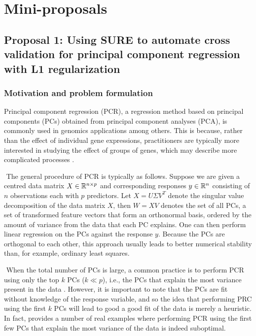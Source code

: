 

\section{Mini-proposals}

\subsection{Proposal 1: Using SURE to automate cross validation for principal component regression with L1 regularization} %
\subsubsection{Motivation and problem formulation}
Principal component regression (PCR), a regression method based on principal components (PCs) obtained from principal component analyses (PCA), is commonly used in genomics applications among others. This is because, rather than the effect of individual gene expressions, practitioners are typically more interested in studying the effect of groups of genes, which may describe more complicated processes \citep{ding2022sufficient}. 

$ $\newline
The general procedure of PCR is typically as follows. Suppose we are given a centred data matrix $X \in \mathbb{R}^{n\times p}$ and corresponding responses $y\in\mathbb{R}^n$ consisting of $n$ observations each with $p$ predictors. Let $X = U\Sigma V^T$ denote the singular value decomposition of the data matrix $X$, then $W = XV$ denotes the set of all PCs, a set of transformed feature vectors that form an orthonormal basis, ordered by the amount of variance from the data that each PC explains. One can then perform linear regression on the PCs against the response $y$. Because the PCs are orthogonal to each other, this approach usually leads to better numerical stability than, for example, ordinary least squares. 

$ $\newline
When the total number of PCs is large, a common practice is to perform PCR using only the top $k$ PCs ($k\ll p$), i.e., the PCs that explain the most variance present in the data \citep{cera2019genes,harel2019predicting}. However, it is important to note that the PCs are fit without knowledge of the response variable, and so the idea that performing PRC using the first $k$ PCs will lead to good a good fit of the data is merely a heuristic. In fact, \citet{jolliffe1982note} provides a number of real examples where performing PCR using the first few PCs that explain the most variance of the data is indeed suboptimal.

